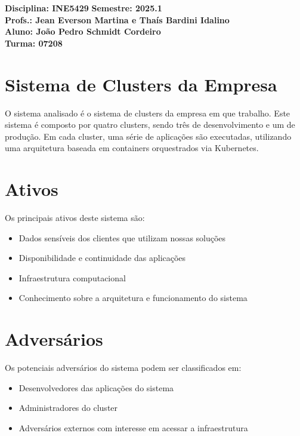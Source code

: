 \documentclass[12pt]{article}
\begin{document}
\begin{center}
    \textbf{Disciplina: INE5429} \hspace{2cm} \textbf{Semestre: 2025.1} \\
    \textbf{Profs.: Jean Everson Martina e Thaís Bardini Idalino} \\
    \textbf{Aluno: João Pedro Schmidt Cordeiro} \\
    \textbf{Turma: 07208}
\end{center}

\vspace{2cm}

\section{Sistema de Clusters da Empresa}

O sistema analisado é o sistema de clusters da empresa em que trabalho. Este sistema é composto por quatro clusters, sendo três de desenvolvimento e um de produção. Em cada cluster, uma série de aplicações são executadas, utilizando uma arquitetura baseada em containers orquestrados via Kubernetes.

\section{Ativos}

Os principais ativos deste sistema são:
\begin{itemize}
    \item Dados sensíveis dos clientes que utilizam nossas soluções
    \item Disponibilidade e continuidade das aplicações
    \item Infraestrutura computacional
    \item Conhecimento sobre a arquitetura e funcionamento do sistema
\end{itemize}

\section{Adversários}

Os potenciais adversários do sistema podem ser classificados em:
\begin{itemize}
    \item Desenvolvedores das aplicações do sistema
    \item Administradores do cluster
    \item Adversários externos com interesse em acessar a infraestrutura
\end{itemize}
\end{document}
